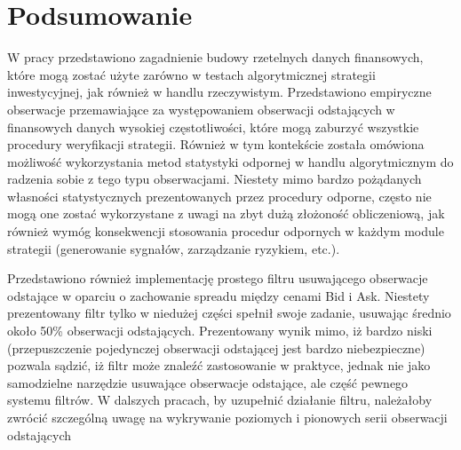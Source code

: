 \documentclass[a4paper,12pt,openany, DIV=calc, headsepline]{scrbook}
\begin{document}
\chapter{Podsumowanie}

W pracy przedstawiono zagadnienie budowy rzetelnych danych finansowych, które mogą zostać użyte zarówno w testach algorytmicznej strategii inwestycyjnej, jak również w handlu rzeczywistym. Przedstawiono empiryczne obserwacje przemawiające za występowaniem obserwacji odstających w finansowych danych wysokiej częstotliwości, które mogą zaburzyć wszystkie procedury weryfikacji strategii. Również w tym kontekście została omówiona możliwość wykorzystania metod statystyki odpornej w handlu algorytmicznym do radzenia sobie z tego typu obserwacjami. Niestety mimo bardzo pożądanych własności statystycznych prezentowanych przez procedury odporne, często nie mogą one zostać wykorzystane z uwagi na zbyt dużą złożoność obliczeniową, jak również wymóg konsekwencji stosowania procedur odpornych w każdym module strategii (generowanie sygnałów, zarządzanie ryzykiem, etc.).

Przedstawiono również implementację prostego filtru usuwającego obserwacje odstające w oparciu o zachowanie spreadu między cenami Bid i Ask. Niestety prezentowany filtr tylko w niedużej części spełnił swoje zadanie, usuwając średnio około 50\% obserwacji odstających. Prezentowany wynik mimo, iż bardzo niski (przepuszczenie pojedynczej obserwacji odstającej jest bardzo niebezpieczne) pozwala sądzić, iż filtr może znaleźć zastosowanie w praktyce, jednak nie jako samodzielne narzędzie usuwające obserwacje odstające, ale część pewnego systemu filtrów. W dalszych pracach, by uzupełnić działanie filtru, należałoby zwrócić szczególną uwagę na wykrywanie poziomych i pionowych serii obserwacji odstających



\listoftables
{}
\listoffigures
{}
\printindex
\end{document}
